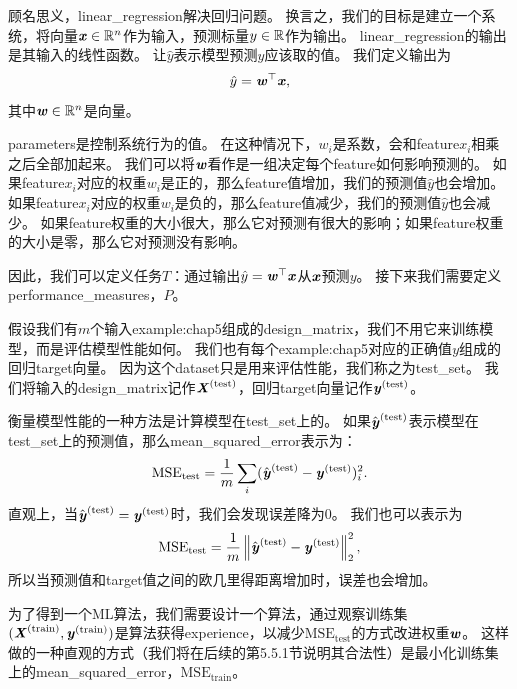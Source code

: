 顾名思义，\gls{linear_regression}解决回归问题。
换言之，我们的目标是建立一个系统，将向量$\boldsymbol{\mathit{x}}\in\mathbb{R}^n$作为输入，预测标量$y\in\mathbb{R}$作为输出。
\gls{linear_regression}的输出是其输入的线性函数。
让$\hat{y}$表示模型预测$y$应该取的值。
我们定义输出为
\begin{equation}
    \hat{y} = \boldsymbol{\mathit{w}}^\top \boldsymbol{\mathit{x}} ,
\end{equation}
其中$\boldsymbol{\mathit{w}}\in\mathbb{R}^n$是向量。

\gls{parameters}是控制系统行为的值。
在这种情况下，$w_i$是系数，会和\gls{feature}$x_i$相乘之后全部加起来。
我们可以将$\boldsymbol{\mathit{w}}$看作是一组决定每个\gls{feature}如何影响预测的。
如果\gls{feature}$x_i$对应的权重$w_i$是正的，那么\gls{feature}值增加，我们的预测值$\hat{y}$也会增加。
如果\gls{feature}$x_i$对应的权重$w_i$是负的，那么\gls{feature}值减少，我们的预测值$\hat{y}$也会减少。
如果\gls{feature}权重的大小很大，那么它对预测有很大的影响；如果\gls{feature}权重的大小是零，那么它对预测没有影响。


因此，我们可以定义任务$T$：通过输出$\hat{y} = \boldsymbol{\mathit{w}}^\top \boldsymbol{\mathit{x}}$从$\boldsymbol{\mathit{x}}$预测$y$。
接下来我们需要定义\gls{performance_measures}，$P$。

假设我们有$m$个输入\gls{example:chap5}组成的\gls{design_matrix}，我们不用它来训练模型，而是评估模型性能如何。
我们也有每个\gls{example:chap5}对应的正确值$y$组成的回归\gls{target}向量。
因为这个\gls{dataset}只是用来评估性能，我们称之为\gls{test_set}。
我们将输入的\gls{design_matrix}记作$\boldsymbol{\mathit{X}}^{\text{(test)}}$，回归\gls{target}向量记作$\boldsymbol{\mathit{y}}^{(\text{test})}$。

衡量模型性能的一种方法是计算模型在\gls{test_set}上的。
如果$\hat{\boldsymbol{\mathit{y}}}^{(\text{test})}$表示模型在\gls{test_set}上的预测值，那么\gls{mean_squared_error}表示为：
\begin{equation}
    \text{MSE}_{\text{test}} = \frac{1}{m} \sum_i ( \hat{\boldsymbol{\mathit{y}}}^{(\text{test})} - \boldsymbol{\mathit{y}}^{(\text{test})})_i^2.
\end{equation}
直观上，当$\hat{\boldsymbol{\mathit{y}}}^{(\text{test})} = \boldsymbol{\mathit{y}}^{(\text{test})}$时，我们会发现误差降为$0$。
我们也可以表示为
\begin{equation}
    \text{MSE}_{\text{test}} = \frac{1}{m} \left\lVert \hat{\boldsymbol{\mathit{y}}}^{(\text{test})} - \boldsymbol{\mathit{y}}^{(\text{test})}\right\rVert_2^2,
\end{equation}
所以当预测值和\gls{target}值之间的欧几里得距离增加时，误差也会增加。

为了得到一个\gls{ML}算法，我们需要设计一个算法，通过观察训练集$(\boldsymbol{\mathit{X}}^{(\text{train})},\boldsymbol{\mathit{y}}^{(\text{train})})$是算法获得\gls{experience}，以减少$\text{MSE}_{\text{test}}$的方式改进权重$\boldsymbol{\mathit{w}}$。
这样做的一种直观的方式（我们将在后续的第5.5.1节说明其合法性）是最小化训练集上的\gls{mean_squared_error}，$\text{MSE}_{\text{train}}$。

